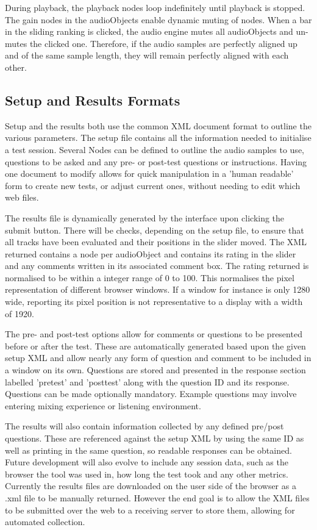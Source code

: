 \documentclass{article}
\begin{document}
During playback, the playback nodes loop indefinitely until playback is stopped. The gain nodes in the audioObjects enable dynamic muting of nodes. When a bar in the sliding ranking is clicked, the audio engine mutes all audioObjects and un-mutes the clicked one. Therefore, if the audio samples are perfectly aligned up and of the same sample length, they will remain perfectly aligned with each other.

\subsection{Setup and Results Formats}\label{sec:setupresultsformats}

Setup and the results both use the common XML document format to outline the various parameters. The setup file contains all the information needed to initialise a test session. Several Nodes can be defined to outline the audio samples to use, questions to be asked and any pre- or post-test questions or instructions. Having one document to modify allows for quick manipulation in a 'human readable' form to create new tests, or adjust current ones, without needing to edit which web files.

The results file is dynamically generated by the interface upon clicking the submit button. There will be checks, depending on the setup file, to ensure that all tracks have been evaluated and their positions in the slider moved. The XML returned contains a node per audioObject and contains its rating in the slider and any comments written in its associated comment box. The rating returned is normalised to be within a integer range of 0 to 100. This normalises the pixel representation of different browser windows. If a window for instance is only 1280 wide, reporting its pixel position is not representative to a display with a width of 1920.

The pre- and post-test options allow for comments or questions to be presented before or after the test. These are automatically generated based upon the given setup XML and allow nearly any form of question and comment to be included in a window on its own. Questions are stored and presented in the response section labelled 'pretest' and 'posttest' along with the question ID and its response. Questions can be made optionally mandatory. Example questions may involve entering mixing experience or listening environment.

The results will also contain information collected by any defined pre/post questions. These are referenced against the setup XML by using the same ID as well as printing in the same question, so readable responses can be obtained. Future development will also evolve to include any session data, such as the browser the tool was used in, how long the test took and any other metrics. Currently the results files are downloaded on the user side of the browser as a .xml file to be manually returned. However the end goal is to allow the XML files to be submitted over the web to a receiving server to store them, allowing for automated collection.
\end{document}
